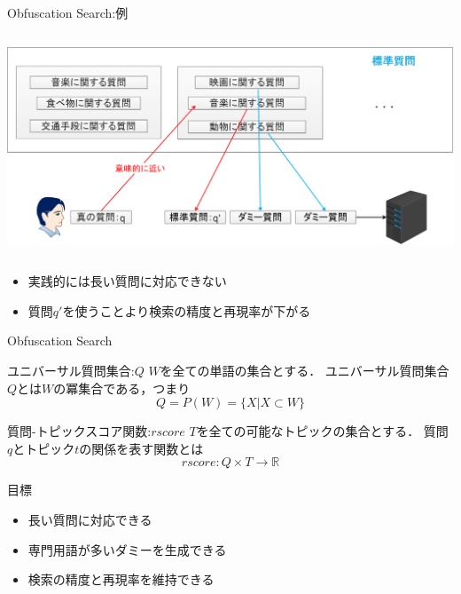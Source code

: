 \documentclass[14pt,xcolor=dvipsnames,table,dvipdfmx]{beamer}
\begin{document}
\begin{frame}{Obfuscation Search:例}
    \begin{columns}[t]
        \begin{column}{1\textwidth} %
            \includegraphics[width=\columnwidth]{rk14.png}
		\end{column}
    \end{columns}
	\begin{block}{} 
		\begin{itemize}
			\item 実践的には長い質問に対応できない
			\item 質問$q'$を使うことより検索の精度と再現率が下がる
		\end{itemize}
	\end{block}
\end{frame}

\begin{frame}{Obfuscation Search}
    \begin{block}{ユニバーサル質問集合:$Q$}
		$W$を全ての単語の集合とする．
		ユニバーサル質問集合$Q$とは$W$の冪集合である，つまり
		\begin{equation}
		Q = P(W) = \{X|X \subset W\}
		\end{equation}
    \end{block}
    \begin{block}{質問-トピックスコア関数:$rscore$}
		$T$を全ての可能なトピックの集合とする．
		質問$q$とトピック$t$の関係を表す関数とは
		\begin{equation}
		rscore:Q \times T \to \mathbb{R}
		\end{equation}
    \end{block}
\end{frame}

\begin{frame}{目標}
    \begin{block}{}
    \begin{itemize}
        \item 長い質問に対応できる
        \item 専門用語が多いダミーを生成できる
		\item 検索の精度と再現率を維持できる
    \end{itemize}
    \end{block}
\end{frame}
\end{document}
